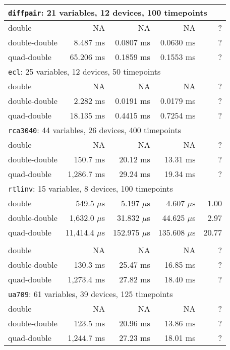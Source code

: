 \begin{center}
\begin{longtable}{|l|r|r|r|r|}
\hline \hline
\multicolumn{5}{|l|}{\texttt{diffpair}: 21 variables, 12 devices, 100 timepoints}  \\ \hline
double  &        NA &        NA &        NA  &      ?   \\
double-double  &  8.487 ms & 0.0807 ms & 0.0630 ms &      ?   \\
quad-double  & 65.206 ms & 0.1859 ms & 0.1553 ms &      ?   \\
\hline \hline
\multicolumn{5}{|l|}{\texttt{ecl}: 25 variables, 12 devices, 50 timepoints}  \\ \hline
double  &        NA &        NA &        NA  &      ?   \\
double-double  &  2.282 ms & 0.0191 ms & 0.0179 ms  &      ?   \\
quad-double  & 18.135 ms & 0.4415 ms & 0.7254 ms &      ?   \\
\hline \hline
\multicolumn{5}{|l|}{\texttt{rca3040}: 44 variables, 26 devices, 400 timepoints}  \\ \hline
double  &         NA &       NA &       NA &      ?   \\
double-double  &   150.7 ms & 20.12 ms & 13.31 ms &      ?   \\
quad-double  & 1,286.7 ms & 29.24 ms & 19.34 ms &      ?   \\
\hline \hline
\multicolumn{5}{|l|}{\texttt{rtlinv}: 15 variables, 8 devices, 100 timepoints}  \\ \hline
double  &    549.5 $\mu{}$s &   5.197 $\mu{}$s &   4.607 $\mu{}$s &   1.00   \\
double-double  &  1,632.0 $\mu{}$s &  31.832 $\mu{}$s &  44.625 $\mu{}$s &   2.97   \\
quad-double  & 11,414.4 $\mu{}$s & 152.975 $\mu{}$s & 135.608 $\mu{}$s &  20.77   \\
\hline \pagebreak
\hline
\multicolumn{5}{|l|}{\texttt{sbdgate}: 65 variables, 35 devices, 200 timepoints}  \\ \hline
double  &         NA &       NA &       NA &      ?   \\
double-double  &   130.3 ms & 25.47 ms & 16.85 ms &      ?   \\
quad-double  & 1,273.4 ms & 27.82 ms & 18.40 ms &      ?   \\
\hline \hline
\multicolumn{5}{|l|}{\texttt{ua709}: 61 variables, 39 devices, 125 timepoints } \\ \hline
double  &         NA &       NA &       NA &      ?   \\
double-double  &   123.5 ms & 20.96 ms & 13.86 ms &      ?   \\
quad-double  & 1,244.7 ms & 27.23 ms & 18.01 ms &      ?   \\
\hline	
	\end{longtable}
\end{center}

